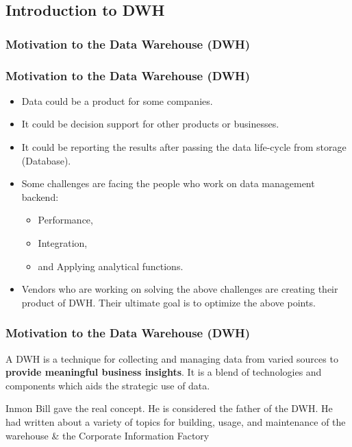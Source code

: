 \subsection{Introduction to DWH}

\subsubsection{Motivation to the Data Warehouse (DWH)}
\begin{frame}
\frametitle{Motivation to the Data Warehouse (DWH)}
	\begin{itemize}[<+->]
		\item Data could be a product for some companies.
		\item It could be decision support for other products or businesses.
		\item It could be reporting the results after passing the data life-cycle from storage (Database).
		\item Some challenges are facing the people who work on data management backend:
			\begin{itemize}[<+->]
				\item Performance,
				\item Integration,
				\item and Applying analytical functions. %
			\end{itemize}
		\item Vendors who are working on solving the above challenges are creating their product of DWH. Their ultimate goal is to optimize the above points.
	\end{itemize}
\end{frame}
\begin{frame}[c]
\frametitle{Motivation to the Data Warehouse (DWH)}

\begin{definition} A DWH is a technique for collecting and managing data from varied sources to \textbf{provide meaningful business insights}. It is a blend of technologies and components which aids the strategic use of data.%
\end{definition}

Inmon Bill gave the real concept. He is considered the father of the DWH. He had written about a variety of topics for building, usage, and maintenance of the warehouse \& the Corporate Information Factory


\end{frame}

